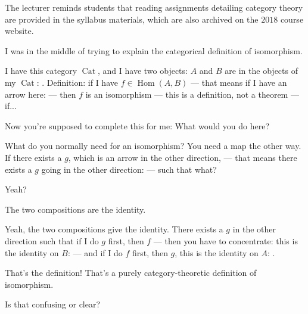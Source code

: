 \begin{note}
The lecturer reminds students that reading assignments detailing category theory are provided in the syllabus materials, which are also archived on the $2018$ course website.
\end{note}

\begin{speech}[01:20:08 - 01:21:17]
I was in the middle of trying to explain the categorical definition of isomorphism.

I have this category $\operatorname{Cat}$,  and I have two objects: $A$ and $B$ are in the objects of my $\operatorname{Cat}$: . Definition:  if I have $f \in \operatorname{Hom}(A, B)$ --- that means if I have an arrow here:  --- then $f$ is an isomorphism --- this is a definition, not a theorem ---  if... 

Now you're supposed to complete this for me: What would you do here?

What do you normally need for an isomorphism? You need a map the other way. If there exists a $g$, which is an arrow in the other direction,  --- that means there exists a $g$ going in the other direction:  --- such that what?

Yeah?
\end{speech}

\begin{student}
The two compositions are the identity.
\end{student}

\begin{speech}[01:21:21 - 01:21:46]
Yeah, the two compositions give the identity. There exists a $g$ in the other direction such that  if I do $g$ first, then $f$ --- then you have to concentrate: this is the identity on $B$:  --- and if I do $f$ first, then $g$, this is the identity on $A$: .

That's the definition! That's a purely category-theoretic definition of isomorphism.

Is that confusing or clear?
\end{speech}

